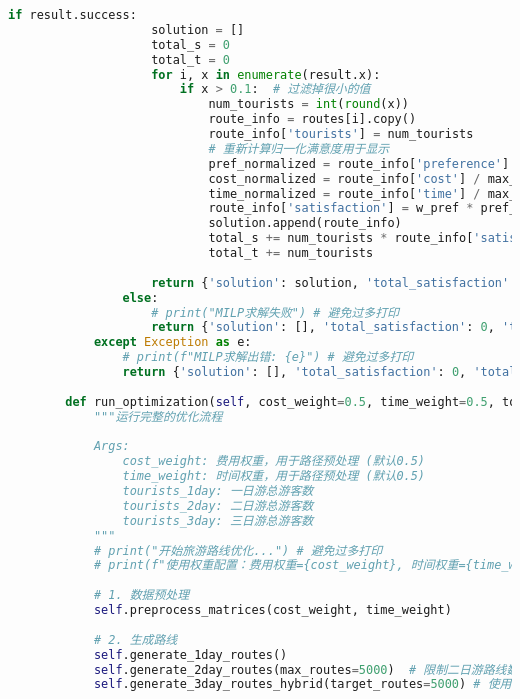 \begin{lstlisting}[language=Python]
                if result.success:
                    solution = []
                    total_s = 0
                    total_t = 0
                    for i, x in enumerate(result.x):
                        if x > 0.1:  # 过滤掉很小的值
                            num_tourists = int(round(x))
                            route_info = routes[i].copy()
                            route_info['tourists'] = num_tourists
                            # 重新计算归一化满意度用于显示
                            pref_normalized = route_info['preference'] / get_max_preference(route_info['type'])
                            cost_normalized = route_info['cost'] / max_cost
                            time_normalized = route_info['time'] / max_time
                            route_info['satisfaction'] = w_pref * pref_normalized - w_cost * cost_normalized - w_time * time_normalized
                            solution.append(route_info)
                            total_s += num_tourists * route_info['satisfaction']
                            total_t += num_tourists
                    
                    return {'solution': solution, 'total_satisfaction': total_s, 'total_tourists': total_t}
                else:
                    # print("MILP求解失败") # 避免过多打印
                    return {'solution': [], 'total_satisfaction': 0, 'total_tourists': 0}
            except Exception as e:
                # print(f"MILP求解出错: {e}") # 避免过多打印
                return {'solution': [], 'total_satisfaction': 0, 'total_tourists': 0}
        
        def run_optimization(self, cost_weight=0.5, time_weight=0.5, tourists_1day=30000, tourists_2day=30000, tourists_3day=20000):
            """运行完整的优化流程
            
            Args:
                cost_weight: 费用权重，用于路径预处理 (默认0.5)
                time_weight: 时间权重，用于路径预处理 (默认0.5)
                tourists_1day: 一日游总游客数
                tourists_2day: 二日游总游客数
                tourists_3day: 三日游总游客数
            """
            # print("开始旅游路线优化...") # 避免过多打印
            # print(f"使用权重配置：费用权重={cost_weight}, 时间权重={time_weight}")
            
            # 1. 数据预处理
            self.preprocess_matrices(cost_weight, time_weight)
            
            # 2. 生成路线
            self.generate_1day_routes()
            self.generate_2day_routes(max_routes=5000)  # 限制二日游路线数量
            self.generate_3day_routes_hybrid(target_routes=5000) # 使用混合方法生成三日游路线
            

\end{lstlisting}
